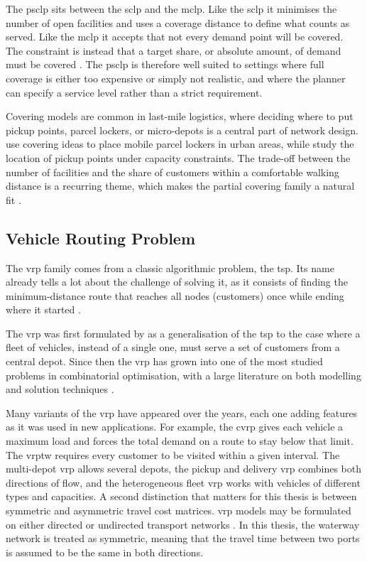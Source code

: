 \documentclass[12pt]{article}
\begin{document}
The \ac{psclp} sits between the \ac{sclp} and the \ac{mclp}. Like the \ac{sclp} it minimises the number of open facilities and uses a coverage distance to define what counts as served. Like the \ac{mclp} it accepts that not every demand point will be covered. The constraint is instead that a target share, or absolute amount, of demand must be covered \parencite{psclp}. The \ac{psclp} is therefore well suited to settings where full coverage is either too expensive or simply not realistic, and where the planner can specify a service level rather than a strict requirement.

Covering models are common in last-mile logistics, where deciding where to put pickup points, parcel lockers, or micro-depots is a central part of network design. \cite{schwerdfeger2020optimizing} use covering ideas to place mobile parcel lockers in urban areas, while \cite{deutsch2018parcel} study the location of pickup points under capacity constraints. The trade-off between the number of facilities and the share of customers within a comfortable walking distance is a recurring theme, which makes the partial covering family a natural fit \parencite{boyer2009last}.

\subsection{Vehicle Routing Problem}
\label{subsec:vehicle-routing-problem}

The \acf{vrp} family comes from a classic algorithmic problem, the \acf{tsp}. Its name already tells a lot about the challenge of solving it, as it consists of finding the minimum-distance route that reaches all nodes (customers) once while ending where it started \parencite{tps}.

The \ac{vrp} was first formulated by \cite{dantzig1959truck} as a generalisation of the \ac{tsp} to the case where a fleet of vehicles, instead of a single one, must serve a set of customers from a central depot. Since then the \ac{vrp} has grown into one of the most studied problems in combinatorial optimisation, with a large literature on both modelling and solution techniques \parencite{VIDAL2020401}.

Many variants of the \ac{vrp} have appeared over the years, each one adding features as it was used in new applications. For example, the \acf{cvrp} gives each vehicle a maximum load and forces the total demand on a route to stay below that limit. The \ac{vrptw} requires every customer to be visited within a given interval. The multi-depot \ac{vrp} allows several depots, the pickup and delivery \ac{vrp} combines both directions of flow, and the heterogeneous fleet \ac{vrp} works with vehicles of different types and capacities. A second distinction that matters for this thesis is between symmetric and asymmetric travel cost matrices. \ac{vrp} models may be formulated on either directed or undirected transport networks \parencite{BRAEKERS2016300}. In this thesis, the waterway network is treated as symmetric, meaning that the travel time between two ports is assumed to be the same in both directions.
\end{document}
